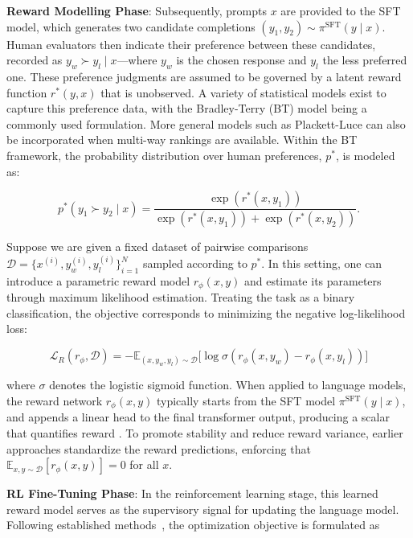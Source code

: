 \textbf{Reward Modelling Phase}: Subsequently, prompts $x$ are provided to the SFT model, which generates two candidate completions $(y_1, y_2)\sim \pi^\text{SFT}(y \mid x)$. Human evaluators then indicate their preference between these candidates, recorded as $y_w\succ y_l \mid x$—where $y_w$ is the chosen response and $y_l$ the less preferred one. These preference judgments are assumed to be governed by a latent reward function $r^*(y, x)$ that is unobserved. A variety of statistical models exist to capture this preference data, with the Bradley-Terry (BT) model \cite{bradley1952rankanalysis} being a commonly used formulation. More general models such as Plackett-Luce \citep{plackett1975analysis, luce2012individual} can also be incorporated when multi-way rankings are available. Within the BT framework, the probability distribution over human preferences, $p^*$, is modeled as:

\begin{equation}\label{eq:bradley-terry}
    p^*(y_1\succ y_2 \mid x)=\frac{\exp\left(r^*(x, y_1)\right)}{\exp\left(r^*(x, y_1)\right) + \exp\left(r^*(x, y_2)\right)}.
\end{equation}

Suppose we are given a fixed dataset of pairwise comparisons $\mathcal{D}=\bigl\{x^{(i)}, y_w^{(i)}, y_l^{(i)}\bigr\}_{i=1}^N$ sampled according to $p^*$. In this setting, one can introduce a parametric reward model $r_{\phi}(x, y)$ and estimate its parameters through maximum likelihood estimation. Treating the task as a binary classification, the objective corresponds to minimizing the negative log-likelihood loss:

\begin{equation}\label{eq:reward_model}
    \mathcal{L}_R(r_{\phi}, \mathcal{D}) = -\mathbb{E}_{(x, y_w, y_l)\sim \mathcal{D}}\bigl[\log \sigma(r_{\phi}(x, y_w)- r_{\phi}(x, y_l))\bigr]
\end{equation}

where $\sigma$ denotes the logistic sigmoid function. When applied to language models, the reward network $r_{\phi}(x, y)$ typically starts from the SFT model $\pi^\text{SFT}(y \mid x)$, and appends a linear head to the final transformer output, producing a scalar that quantifies reward \cite{ziegler2020finetuning}. To promote stability and reduce reward variance, earlier approaches standardize the reward predictions, enforcing that $\mathbb{E}_{x,y\sim \mathcal{D}}\left[r_\phi(x, y)\right] = 0$ for all $x$.

\textbf{RL Fine-Tuning Phase}: In the reinforcement learning stage, this learned reward model serves as the supervisory signal for updating the language model. Following established methods~\citep{jaques2017sequence, jaques2020human}, the optimization objective is formulated as

